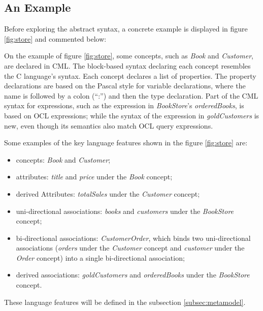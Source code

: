 \subsection{An Example}\label{subsec:example}

Before exploring the abstract syntax, a concrete example is displayed in figure \ref{fig:store} and commented below:

\pagebreak



On the example of figure \ref{fig:store}, some concepts, such as \emph{Book} and \emph{Customer}, are declared in CML. 
The block-based syntax declaring each concept resembles the C \cite{clang} language's syntax. 
Each concept declares a list of properties.
The property declarations are based on the Pascal \cite{pascal} style for variable declarations,
where the name is followed by a colon (``:'') and then the type declaration.
Part of the CML syntax for expressions, such as the expression in \emph{BookStore}'s \emph{orderedBooks}, is based on OCL \cite{ocl} expressions; while the syntax of the expression in \emph{goldCustomers} is new, even though its semantics also match OCL \cite{ocl} query expressions.

Some examples of the key language features shown in the figure \ref{fig:store} are:
\begin{itemize}
\item concepts: \emph{Book} and \emph{Customer};
\item attributes: \emph{title} and \emph{price} under the \emph{Book} concept;  
\item derived Attributes: \emph{totalSales} under the \emph{Customer} concept;
\item uni-directional associations: \emph{books} and \emph{customers} under the \emph{BookStore} concept;
\item bi-directional associations: \emph{CustomerOrder},
which binds two uni-directional associations (\emph{orders} under the \emph{Customer} concept and \emph{customer} under the \emph{Order} concept) into a single bi-directional association;
\item derived associations: \emph{goldCustomers} and \emph{orderedBooks} under the \emph{BookStore} concept.
\end{itemize}

These language features will be defined in the subsection \ref{subsec:metamodel}.